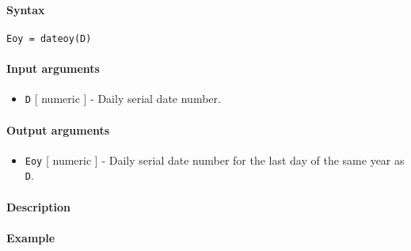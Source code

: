 


	\paragraph{Syntax}\label{syntax}

\begin{verbatim}
Eoy = dateoy(D)
\end{verbatim}

\paragraph{Input arguments}\label{input-arguments}

\begin{itemize}
\itemsep1pt\parskip0pt
\item
  \texttt{D} {[} numeric {]} - Daily serial date number.
\end{itemize}

\paragraph{Output arguments}\label{output-arguments}

\begin{itemize}
\itemsep1pt\parskip0pt
\item
  \texttt{Eoy} {[} numeric {]} - Daily serial date number for the last
  day of the same year as \texttt{D}.
\end{itemize}

\paragraph{Description}\label{description}

\paragraph{Example}\label{example}


